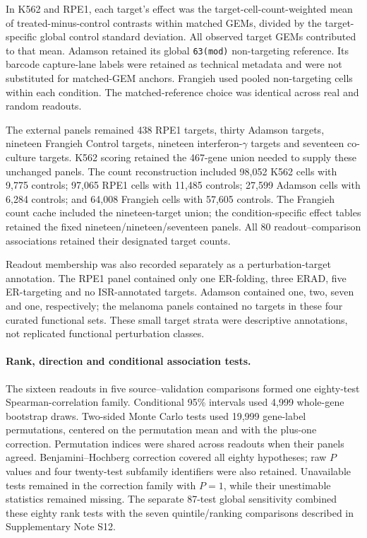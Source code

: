 \documentclass[a4paper,fleqn]{cas-sc}
\makeatletter
\DeclareRobustCommand{\rev}[1]{{\color{red}\def\@citecolor{black}\def\@linkcolor{red}\def\@urlcolor{red}#1}}
\makeatother
\begin{document}
\rev{In K562 and RPE1, each target's effect was the target-cell-count-weighted mean of treated-minus-control contrasts within matched GEMs, divided by the target-specific global control standard deviation.} \rev{All observed target GEMs contributed to that mean.} \rev{Adamson retained its global \texttt{63(mod)} non-targeting reference.} \rev{Its barcode capture-lane labels were retained as technical metadata and were not substituted for matched-GEM anchors.} \rev{Frangieh used pooled non-targeting cells within each condition.} \rev{The matched-reference choice was identical across real and random readouts.}

\rev{The external panels remained 438 RPE1 targets, thirty Adamson targets, nineteen Frangieh Control targets, nineteen interferon-$\gamma$ targets and seventeen co-culture targets.} \rev{K562 scoring retained the 467-gene union needed to supply these unchanged panels.} \rev{The count reconstruction included 98,052 K562 cells with 9,775 controls; 97,065 RPE1 cells with 11,485 controls; 27,599 Adamson cells with 6,284 controls; and 64,008 Frangieh cells with 57,605 controls.} \rev{The Frangieh count cache included the nineteen-target union; the condition-specific effect tables retained the fixed nineteen/nineteen/seventeen panels.} \rev{All 80 readout--comparison associations retained their designated target counts.}

\rev{Readout membership was also recorded separately as a perturbation-target annotation.} \rev{The RPE1 panel contained only one ER-folding, three ERAD, five ER-targeting and no ISR-annotated targets.} \rev{Adamson contained one, two, seven and one, respectively; the melanoma panels contained no targets in these four curated functional sets.} \rev{These small target strata were descriptive annotations, not replicated functional perturbation classes.}

\paragraph{\rev{Rank, direction and conditional association tests.}}
\rev{The sixteen readouts in five source--validation comparisons formed one eighty-test Spearman-correlation family.} \rev{Conditional 95\% intervals used 4,999 whole-gene bootstrap draws.} \rev{Two-sided Monte Carlo tests used 19,999 gene-label permutations, centered on the permutation mean and with the plus-one correction.} \rev{Permutation indices were shared across readouts when their panels agreed.} \rev{Benjamini--Hochberg correction covered all eighty hypotheses; raw $P$ values and four twenty-test subfamily identifiers were also retained.} \rev{Unavailable tests remained in the correction family with $P=1$, while their unestimable statistics remained missing.} \rev{The separate 87-test global sensitivity combined these eighty rank tests with the seven quintile/ranking comparisons described in Supplementary Note S12.}
\end{document}
